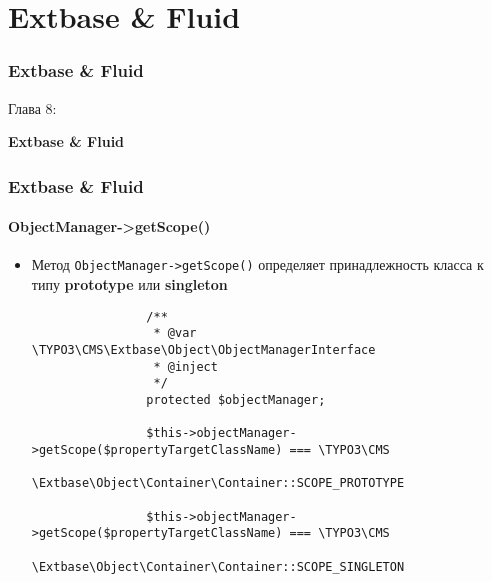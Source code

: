 %

\section{Extbase \& Fluid}
\begin{frame}[fragile]
	\frametitle{Extbase \& Fluid}

	\begin{center}\huge{Глава 8:}\end{center}
	\begin{center}\huge{\color{typo3darkgrey}\textbf{Extbase \& Fluid}}\end{center}

\end{frame}


\begin{frame}[fragile]
	\frametitle{Extbase \& Fluid}
	\framesubtitle{ObjectManager->getScope()}

	\lstset{
		basicstyle=\tiny\ttfamily
	}

	\begin{itemize}
		\item Метод \texttt{ObjectManager->getScope()} определяет\newline
			принадлежность класса к типу \textbf{prototype} или \textbf{singleton}

			\begin{lstlisting}
				/**
				 * @var \TYPO3\CMS\Extbase\Object\ObjectManagerInterface
				 * @inject
				 */
				protected $objectManager;

				$this->objectManager->getScope($propertyTargetClassName) === \TYPO3\CMS
				\Extbase\Object\Container\Container::SCOPE_PROTOTYPE

				$this->objectManager->getScope($propertyTargetClassName) === \TYPO3\CMS
				\Extbase\Object\Container\Container::SCOPE_SINGLETON
			\end{lstlisting}

	\end{itemize}

\end{frame}

